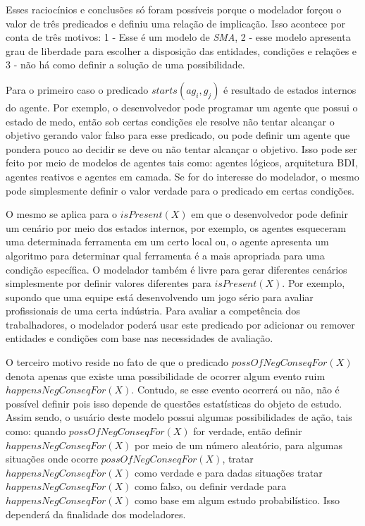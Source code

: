 Esses raciocínios e conclusões só foram possíveis porque o modelador forçou o valor de três predicados e definiu uma relação de implicação. Isso acontece por conta de três motivos: 1 - Esse é um modelo de \textit{SMA}, 2 - esse modelo apresenta grau de liberdade para escolher a disposição das entidades, condições e relações e 3 - não há como definir a solução de uma possibilidade. 

Para o primeiro caso o predicado $starts(ag_i,g_j)$ é resultado de estados internos do agente. Por exemplo, o desenvolvedor pode programar um agente que possui o estado de medo, então sob certas condições ele resolve não tentar alcançar o objetivo gerando valor falso para esse predicado, ou pode definir um agente que pondera pouco ao decidir se deve ou não tentar alcançar o objetivo. Isso pode ser feito por meio de modelos de agentes tais como: agentes lógicos, arquitetura BDI, agentes reativos e agentes em camada. Se for do interesse do modelador, o mesmo pode simplesmente definir o valor verdade para o predicado em certas condições. 

O mesmo se aplica para o $isPresent(X)$ em que o desenvolvedor pode definir um cenário por meio dos estados internos, por exemplo, os agentes esqueceram uma determinada ferramenta em um certo local ou, o agente apresenta um algoritmo para determinar qual ferramenta é a mais apropriada para uma condição específica. O modelador também é livre para gerar diferentes cenários simplesmente por definir valores diferentes para $isPresent(X)$. Por exemplo, supondo que uma equipe está desenvolvendo um jogo sério para avaliar profissionais de uma certa indústria. Para avaliar a competência dos trabalhadores, o modelador poderá usar este predicado por adicionar ou remover entidades e condições com base nas necessidades de avaliação.

O terceiro motivo reside no fato de que o predicado $possOfNegConseqFor(X)$ denota apenas que existe uma possibilidade de ocorrer algum evento ruim  $happensNegConseqFor(X)$. Contudo, se esse evento ocorrerá ou não, não é possível definir pois isso depende de questões estatísticas do objeto de estudo. Assim sendo, o usuário deste modelo possui algumas possibilidades de ação, tais como: quando $possOfNegConseqFor(X)$  for verdade, então definir $happensNegConseqFor(X)$ por meio de um número aleatório, para algumas situações onde ocorre $possOfNegConseqFor(X)$, tratar $happensNegConseqFor(X)$ como verdade e para dadas situações tratar $happensNegConseqFor(X)$ como falso, ou definir verdade para $happensNegConseqFor(X)$ como base em algum estudo probabilístico. Isso dependerá da finalidade dos modeladores. 